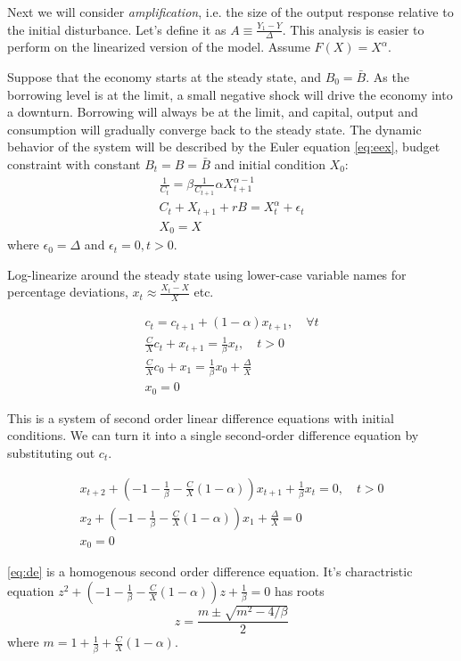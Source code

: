 \documentclass{article}
\begin{document}
Next we will consider \emph{amplification}, i.e. the size of the
output response relative to the initial disturbance. Let's define it
as $A\equiv\frac{Y_1-Y}{\Delta}$. This analysis is easier to perform on
the linearized version of the model. Assume $F(X)=X^\alpha$.

Suppose that the economy starts at the steady state, and
$B_0=\bar{B}$. As the borrowing level is at the limit, a small
negative shock will drive the economy into a downturn. Borrowing will
always be at the limit, and capital, output and consumption will
gradually converge back to the steady state. The dynamic behavior of
the system will be described by the Euler equation \eqref{eq:eex},
budget constraint with constant $B_t=B=\bar{B}$ and initial condition
$X_0$:
\begin{gather*}
  \frac{1}{C_t}=\beta\frac{1}{C_{t+1}}\alpha X_{t+1}^{\alpha-1}\\
  C_t+X_{t+1}+rB=X_t^\alpha+\epsilon_t\\
  X_0=X
\end{gather*}
where $\epsilon_0=\Delta$ and $\epsilon_t=0,t>0$.

Log-linearize around the steady state using lower-case variable names
for percentage deviations, $x_t\approx\frac{X_t-X}{X}$ etc.

\begin{gather*}
  c_t=c_{t+1}+(1-\alpha)x_{t+1},\quad\forall t\\
  \frac{C}{X}c_t+x_{t+1}=\frac{1}{\beta}x_t,\quad t>0\\
  \frac{C}{X}c_0+x_{1}=\frac{1}{\beta}x_0+\frac{\Delta}{X}\\
  x_0=0
\end{gather*}

This is a system of second order linear difference equations with
initial conditions. We can turn it into a single second-order
difference equation by substituting out $c_t$.

\begin{gather}
  x_{t+2}+(-1-\frac{1}{\beta}-\frac{C}{X}(1-\alpha))x_{t+1}+\frac{1}{\beta}x_t=0,\quad t>0\label{eq:de}\\
  x_{2}+(-1-\frac{1}{\beta}-\frac{C}{X}(1-\alpha))x_{1}+\frac{\Delta}{X}=0\label{eq:ini}\\
  x_0=0\nonumber
\end{gather}

\eqref{eq:de} is a homogenous second order difference equation. It's
charactristic equation
$z^2+(-1-\frac{1}{\beta}-\frac{C}{X}(1-\alpha))z+\frac{1}{\beta}=0$ has roots
\begin{equation*}
  z=\frac{m\pm\sqrt{m^2-4/\beta}}{2}
\end{equation*}
where $m=1+\frac{1}{\beta}+\frac{C}{X}(1-\alpha)$.
\end{document}
